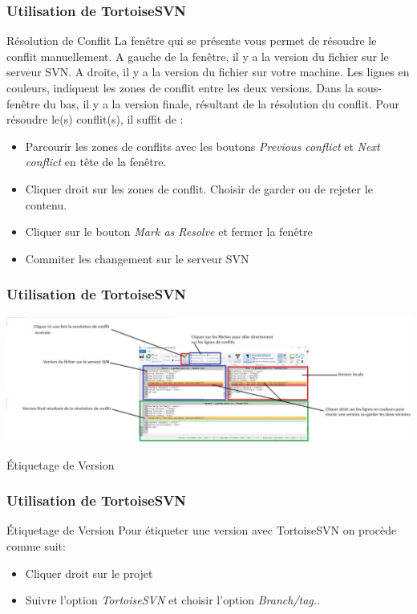 \documentclass{beamer}
\begin{document}
\begin{frame}
\frametitle{Utilisation de TortoiseSVN}
\begin{block}{Résolution de Conflit}
La fenêtre qui se présente vous permet de résoudre le conflit manuellement. A gauche de la fenêtre, il y a la version du fichier sur le serveur SVN.  A droite, il y a la version du fichier sur votre machine. Les lignes en couleurs, indiquent les zones de conflit entre les deux versions. Dans la sous-fenêtre du bas, il y a la version finale, résultant de la résolution du conflit.  Pour résoudre le(s) conflit(s), il suffit de :
\begin{itemize}
\item Parcourir les zones de conflits avec les boutons \alert{\textit{Previous conflict}} et \alert{\textit{Next conflict}} en tête de la fenêtre.
\item Cliquer droit sur les zones de conflit. Choisir de garder ou de rejeter le contenu.
\item Cliquer sur le bouton \alert{\textit{Mark as Resolve}} et fermer la fenêtre
\item Commiter les changement sur le serveur SVN
\end{itemize}

\end{block}
\end{frame}
\begin{frame}
\frametitle{Utilisation de TortoiseSVN}
\includegraphics[scale=0.3]{../images/conflit5.jpg}
\end{frame}


\begin{frame}
\begin{center}
\huge{Étiquetage de Version}
\end{center}
\end{frame}

\begin{frame}
\frametitle{Utilisation de TortoiseSVN}
\begin{block}{Étiquetage de Version}
Pour étiqueter une version avec TortoiseSVN on procède comme suit:
\begin{itemize}
\item Cliquer droit sur le projet
\item Suivre l'option \alert{\textit{TortoiseSVN}} et choisir l'option \alert{\textit{Branch/tag..}}
\end{itemize}
\end{block}
\end{frame}
\end{document}
